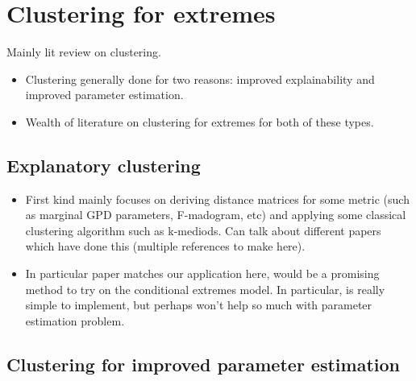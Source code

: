 \documentclass{article}
\numberwithin{equation}{section}
\begin{document}
\section{Clustering for extremes}\label{sec:clustering}

Mainly lit review on clustering. 
\begin{itemize}
  \item Clustering generally done for two reasons: improved explainability and improved parameter estimation. 
  \item Wealth of literature on clustering for extremes for both of these types. 
\end{itemize}

\subsection{Explanatory clustering}

\begin{itemize}
  \item First kind mainly focuses on deriving distance matrices for some metric (such as marginal GPD parameters, F-madogram, etc) and applying some classical clustering algorithm such as k-mediods. Can talk about different papers which have done this (multiple references to make here).
  \item In particular \cite{Vignotto2021} paper matches our application here, would be a promising method to try on the conditional extremes model. In particular, is really simple to implement, but perhaps won't help so much with parameter estimation problem. 
\end{itemize}

\subsection{Clustering for improved parameter estimation}
\end{document}
